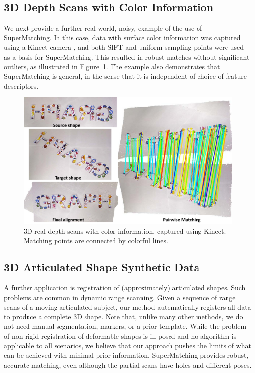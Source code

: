 \subsection{3D Depth Scans with Color Information}
\label{subsec:3dColored}

We next provide a further real-world, noisy, example of the use of SuperMatching.
In this case, data with surface color information was captured using a Kinect camera \cite{Kinect12},
and both SIFT and uniform sampling points were used as a basis for SuperMatching.
This resulted in robust matches without significant outliers, as illustrated in Figure~\ref{fig:3DReal}.
The example also demonstrates that SuperMatching is general, in the sense that it is independent of choice of feature descriptors.

\begin{figure}[h]
\centering
  \includegraphics[width=1.05\linewidth]{figures/kinect.pdf}
  \caption{3D real depth scans with color information, captured using Kinect.
    Matching points are connected by colorful lines.}
\label{fig:3DReal}
\end{figure}

\subsection{3D Articulated Shape Synthetic Data}
\label{subsec:3darticulated}

A further application is registration of (approximately) articulated shapes. Such problems are common in dynamic range scanning.
Given a sequence of range scans of a moving articulated subject, our method automatically registers all data to produce a complete 3D shape.
Note that, unlike many other methods, we do not need  manual segmentation,  markers, or a prior template.
While the problem of non-rigid registration of deformable shapes is ill-posed and no algorithm is applicable to all scenarios,
we believe that our approach pushes the limits of what can be achieved with minimal prior information. SuperMatching provides robust, accurate matching,
even although the partial scans have holes and different poses.

